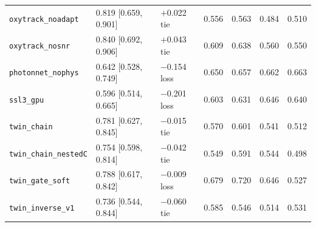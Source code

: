 {\begin{longtable}{@{}p{3.4cm}p{3.3cm}p{2.7cm}cccc@{}}
\texttt{oxytrack\_noadapt} & 0.819 [0.659, 0.901] & $+$0.022 tie & 0.556 & 0.563 & 0.484 & 0.510 \\
\texttt{oxytrack\_nosnr} & 0.840 [0.692, 0.906] & $+$0.043 tie & 0.609 & 0.638 & 0.560 & 0.550 \\
\texttt{photonnet\_nophys} & 0.642 [0.528, 0.749] & $-$0.154 loss & 0.650 & 0.657 & 0.662 & 0.663 \\
\texttt{ssl3\_gpu} & 0.596 [0.514, 0.665] & $-$0.201 loss & 0.603 & 0.631 & 0.646 & 0.640 \\
\texttt{twin\_chain} & 0.781 [0.627, 0.845] & $-$0.015 tie & 0.570 & 0.601 & 0.541 & 0.512 \\
\texttt{twin\_chain\_nestedC} & 0.754 [0.598, 0.814] & $-$0.042 tie & 0.549 & 0.591 & 0.544 & 0.498 \\
\texttt{twin\_gate\_soft} & 0.788 [0.617, 0.842] & $-$0.009 loss & 0.679 & 0.720 & 0.646 & 0.527 \\
\texttt{twin\_inverse\_v1} & 0.736 [0.544, 0.844] & $-$0.060 tie & 0.585 & 0.546 & 0.514 & 0.531 \\
\end{longtable}
}
